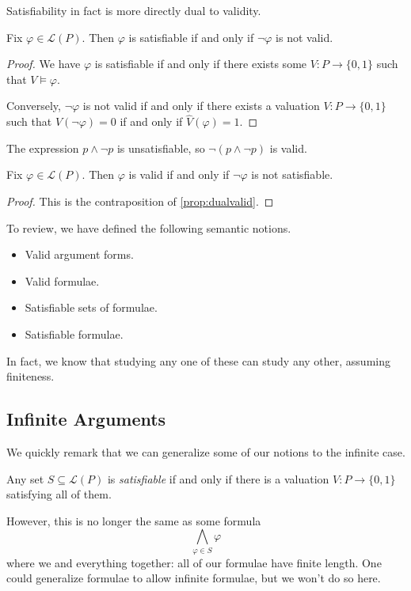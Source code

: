\documentclass[../notes.tex]{subfiles}
\begin{document}
Satisfiability in fact is more directly dual to validity.
\begin{proposition} \label{prop:dualvalid}
	Fix $\varphi\in\mathcal L(P)$. Then $\varphi$ is satisfiable if and only if $\lnot\varphi$ is not valid.
\end{proposition}
\begin{proof}
	We have $\varphi$ is satisfiable if and only if there exists some $V:P\to\{0,1\}$ such that $V\models\varphi$.

	Conversely, $\lnot\varphi$ is not valid if and only if there exists a valuation $V:P\to\{0,1\}$ such that $\hat V(\lnot\varphi)=0$ if and only if $\hat V(\varphi)=1$.
\end{proof}
\begin{example}
	The expression $p\land\lnot p$ is unsatisfiable, so $\lnot(p\land\lnot p)$ is valid.
\end{example}
\begin{corollary}
	Fix $\varphi\in\mathcal L(P)$. Then $\varphi$ is valid if and only if $\lnot\varphi$ is not satisfiable.
\end{corollary}
\begin{proof}
	This is the contraposition of \autoref{prop:dualvalid}.
\end{proof}
To review, we have defined the following semantic notions.
\begin{itemize}
	\item Valid argument forms.
	\item Valid formulae.
	\item Satisfiable sets of formulae.
	\item Satisfiable formulae.
\end{itemize}
In fact, we know that studying any one of these can study any other, assuming finiteness.

\subsection{Infinite Arguments}
We quickly remark that we can generalize some of our notions to the infinite case.
\begin{definition}[Satisfiable]
	Any set $S\subseteq\mathcal L(P)$ is \textit{satisfiable} if and only if there is a valuation $V:P\to\{0,1\}$ satisfying all of them.
\end{definition}
However, this is no longer the same as some formula
\[\bigwedge_{\varphi\in S}\varphi\]
where we and everything together: all of our formulae have finite length. One could generalize formulae to allow infinite formulae, but we won't do so here.
\end{document}
